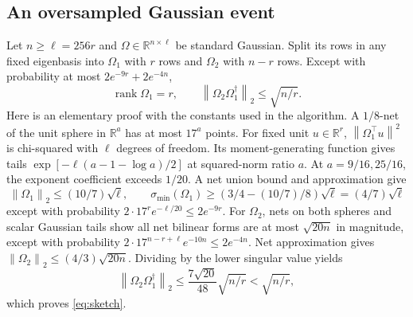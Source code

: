 \documentclass[11pt]{article}
\numberwithin{equation}{section}
\theoremstyle{remark}\newtheorem{remark}[theorem]{Remark}
\newcommand{\R}{\mathbb R}
\newcommand{\norm}[1]{\left\lVert #1\right\rVert}
\newcommand{\rank}{\operatorname{rank}}
\begin{document}
\subsection{An oversampled Gaussian event}
Let $n\ge\ell=256r$ and $\Omega\in\R^{n\times\ell}$ be standard Gaussian. Split its rows in any fixed eigenbasis into $\Omega_1$ with $r$ rows and $\Omega_2$ with $n-r$ rows. Except with probability at most $2e^{-9r}+2e^{-4n}$,
\begin{equation}\label{eq:sketch}
\rank\Omega_1=r,\qquad \norm{\Omega_2\Omega_1^\dagger}_2\le\sqrt{n/r}.
\end{equation}
Here is an elementary proof with the constants used in the algorithm. A $1/8$-net of the unit sphere in $\R^a$ has at most $17^a$ points. For fixed unit $u\in\R^r$, $\norm{\Omega_1^\top u}^2$ is chi-squared with $\ell$ degrees of freedom. Its moment-generating function gives tails
$\exp[-\ell(a-1-\log a)/2]$ at squared-norm ratio $a$. At $a=9/16,25/16$, the exponent coefficient exceeds $1/20$. A net union bound and approximation give
\[
\norm{\Omega_1}_2\le(10/7)\sqrt\ell,\qquad
\sigma_{\min}(\Omega_1)\ge(3/4-(10/7)/8)\sqrt\ell=(4/7)\sqrt\ell
\]
except with probability $2\cdot17^r e^{-\ell/20}\le2e^{-9r}$.
For $\Omega_2$, nets on both spheres and scalar Gaussian tails show all net bilinear forms are at most $\sqrt{20n}$ in magnitude, except with probability $2\cdot17^{n-r+\ell}e^{-10n}\le2e^{-4n}$. Net approximation gives $\norm{\Omega_2}_2\le(4/3)\sqrt{20n}$. Dividing by the lower singular value yields
\[
\norm{\Omega_2\Omega_1^\dagger}_2
\le\frac{7\sqrt{20}}{48}\sqrt{n/r}<\sqrt{n/r},
\]
which proves \eqref{eq:sketch}.
\end{document}
